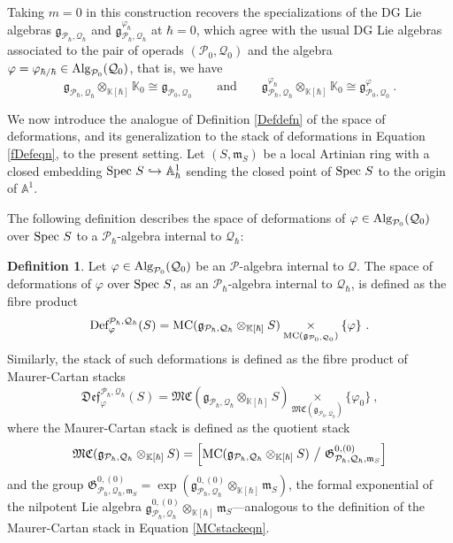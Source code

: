 \documentclass[11pt]{amsart}
\numberwithin{equation}{section}
\theoremstyle{definition}
\newtheorem{defn}[theo]{Definition}
\newcommand{\bb}{\mathbb}
\newcommand{\mc}{\mathcal}
\newcommand{\mf}{\mathfrak}
\newcommand{\Def}{{\textup{Def}}}
\newcommand{\fDef}{{\mathfrak{Def}}}
\newcommand{\Ph}{{\mathcal{P}_\hbar}}
\newcommand{\Qh}{{\mathcal{Q}_\hbar}}
\newcommand{\gPQh}{{\mathfrak{g}_{\mc P_\hbar,\mc Q_\hbar}}}
\newcommand{\gPQvh}{{\mathfrak{g}^{\varphi_\hbar}_{\mc P_\hbar,\mc Q_\hbar}}}
\newcommand{\fph}{{[\![\hbar]\!]}}
\newcommand{\K}{{\bb K}}
\newcommand{\into}{{\ \hookrightarrow\ }}
\newcommand{\Spec}{{\textup{Spec\ }}}
\newcommand{\Alg}{{\textup{Alg}}}
\newcommand{\MC}{{{\textup{MC}}}}
\newcommand{\fMC}{{{\mathfrak{MC}}}}
\newcommand{\0}{{\textbf{0}}}
\newcommand{\g}{{\mf{g}}}
\def\IA{\mathbb{A}}
\def\PP{{\mc P}}
\def\QQ{{\mc Q}}
\def \mf{\mathfrak}
\newcommand{\fibre}[1]{\underset{#1}{\times}}
\begin{document}
Taking $m=0$ in this construction recovers the specializations of the DG Lie algebras $\gPQh$ and $\gPQvh$ at $\hbar=0$, which agree with the usual DG Lie algebras associated to the pair of operads $(\mc P_0,\mc Q_0)$ and the algebra $\varphi=\varphi_{\hbar/\hbar} \in \Alg_{\mc P_0}(\mc Q_0)$, that is, we have
\[ \gPQh \otimes_{\K[\hbar]} \K_0 \cong  \g_{\mc P_0,\mc Q_0} \qquad \text{and}\qquad \gPQvh \otimes_{\K[\hbar]} \K_0 \cong  \g_{\mc P_0,\mc Q_0}^\varphi \ . \]


We now introduce the analogue of Definition \ref{Defdefn} of the space of deformations, and its generalization to the stack of deformations in Equation \ref{fDefeqn}, to the present setting. Let $(S,\mf m_S)$ be a local Artinian ring with a closed embedding $\Spec S \into \IA^1_\hbar$ sending the closed point of $\Spec S$ to the origin of $\IA^1$.


The following definition describes the space of deformations of $\varphi\in\Alg_{\PP_0}(\QQ_0)$ over $\Spec S$ to a $\mc P_\hbar$-algebra internal to $\mc Q_\hbar$:

\begin{defn}\label{Defhbardefn} 
Let $\varphi\in \Alg_{\mc P_0}(\mc Q_0)$ be an $\mc P$-algebra internal to $\mc Q$. The space of deformations of $\varphi$ over $\Spec S$, as an $\mc P_\hbar$-algebra internal to $\mc Q_\hbar$, is defined as the fibre product
\[ 
\Def_\varphi^{\Ph,\Qh}(S) = \MC(\gPQh\otimes_{\K[\hbar]} S) \fibre{\MC(\g_{\mc P_0,\mc Q_0})} \{\varphi\} \ .  
\]
Similarly, the stack of such deformations is defined as the fibre product of Maurer-Cartan stacks
\[
\fDef_{\varphi}^{\Ph,\Qh}(S) = \fMC(\gPQh\otimes_{\K[\hbar]} S) \fibre{\fMC(\g_{\mc P_0,\mc Q_0})} \{\varphi_0\} \ , 
\]
where the Maurer-Cartan stack is defined as the quotient stack
\[ 
\fMC(\g_{\Ph,\Qh }\otimes_{\K[\hbar]} S)= \left[ \MC(\g_{\Ph,\Qh }\otimes_{\K[\hbar]} S)\  \big/\  \mf G^{0,(0)}_{\Ph,\Qh,\mf m_S} \right]  
\]
and the group $\mf G^{0,(0)}_{\Ph,\Qh,\mf m_S}=\exp(\g^{0,(0)}_{\Ph,\Qh}\otimes_{\K[\hbar]} \mf m_S)$, the formal exponential of the nilpotent Lie algebra $\g^{0,(0)}_{\Ph,\Qh}\otimes_{\K[\hbar]} \mf m_S$---analogous to the definition of the Maurer-Cartan stack in Equation \ref{MCstackeqn}.
\end{defn}
\end{document}
